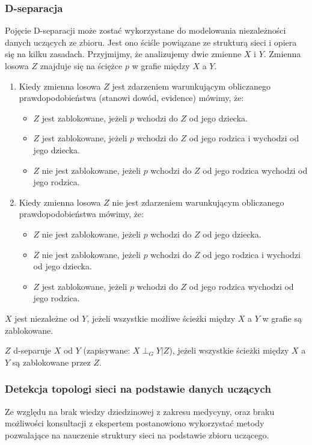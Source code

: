 \documentclass{article}
\begin{document}
\subsubsection{D-separacja}

Pojęcie D-separacji może zostać wykorzystane do modelowania niezależności danych uczących ze zbioru. Jest ono ściśle powiązane ze strukturą sieci i opiera się na kilku zasadach. Przyjmijmy, że analizujemy dwie zmienne $X$ i $Y$. Zmienna losowa $Z$ znajduje się na ściężce $p$ w grafie między $X$ a $Y$.
\begin{enumerate}
\item Kiedy zmienna losowa $Z$ jest zdarzeniem warunkującym obliczanego prawdopodobieństwa (stanowi dowód, evidence) mówimy, że:
\begin{itemize}
 \item $Z$ jest zablokowane, jeżeli $p$ wchodzi do $Z$ od jego dziecka.
 \item $Z$ jest zablokowane, jeżeli $p$ wchodzi do $Z$ od jego rodzica i wychodzi od jego dziecka.
 \item $Z$ nie jest zablokowane, jeżeli $p$ wchodzi do $Z$ od jego rodzica wychodzi od jego rodzica.
\end{itemize}
\item Kiedy zmienna losowa $Z$ nie jest zdarzeniem warunkującym obliczanego prawdopodobieństwa mówimy, że:
\begin{itemize}
 \item $Z$ nie jest zablokowane, jeżeli $p$ wchodzi do $Z$ od jego dziecka.
 \item $Z$ nie jest zablokowane, jeżeli $p$ wchodzi do $Z$ od jego rodzica i wychodzi od jego dziecka.
 \item $Z$ jest zablokowane, jeżeli $p$ wchodzi do $Z$ od jego rodzica wychodzi od jego rodzica.
\end{itemize}
\end{enumerate}

$X$ jest niezależne od $Y$, jeżeli wszystkie możliwe ścieżki między $X$ a $Y$ w grafie są zablokowane.

$Z$ d-separuje $X$ od $Y$ (zapisywane: $X \perp_G Y|Z$), jeżeli wszystkie ścieżki między $X$ a $Y$ są zablokowane przez $Z$.

\subsubsection{Detekcja topologi sieci na podstawie danych uczących}

Ze względu na brak wiedzy dziedzinowej z zakresu medycyny, oraz braku możliwości konsultacji z ekspertem postanowiono wykorzystać metody pozwalające na nauczenie struktury sieci na podstawie zbioru uczącego.
\end{document}

